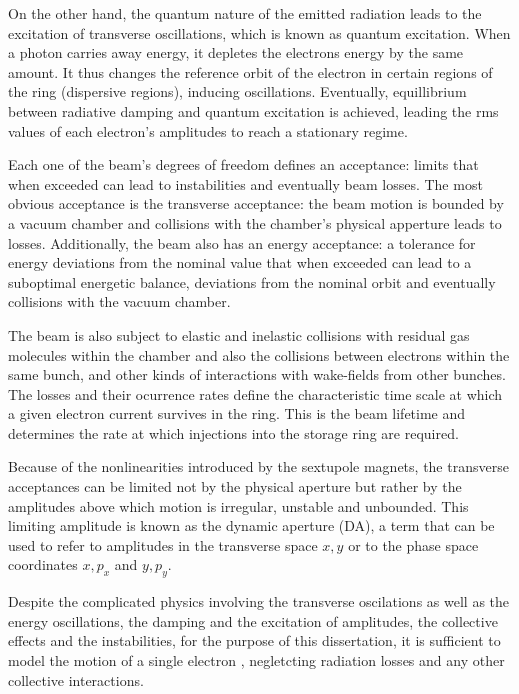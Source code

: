 On the other hand, the quantum nature of the emitted radiation leads to the excitation of transverse oscillations, which is known as quantum excitation. When a photon carries away energy, it depletes the electrons energy by the same amount. It thus changes the reference orbit of the electron in certain regions of the ring (dispersive regions), inducing oscillations. Eventually, equillibrium between radiative damping and quantum excitation is achieved, leading the rms values of each electron's amplitudes to reach a stationary regime.

Each one of the beam's degrees of freedom defines an acceptance: limits that when exceeded can lead to instabilities and eventually beam losses. The most obvious acceptance is the transverse acceptance: the beam motion is bounded by a vacuum chamber and collisions with the chamber's physical apperture leads to losses. Additionally, the beam also has an energy acceptance: a tolerance for energy deviations from the nominal value that when exceeded can lead  to a suboptimal energetic balance, deviations from the nominal orbit and eventually collisions with the vacuum chamber.

The beam is also subject to elastic and inelastic collisions with residual gas molecules within the chamber and also the collisions between electrons within the same bunch, and other kinds of interactions with wake-fields from other bunches. The losses and their ocurrence rates define the characteristic time scale at which a given electron current survives in the ring. This is the beam lifetime and determines the rate at which injections into the storage ring are required.

Because of the nonlinearities introduced by the sextupole magnets, the transverse acceptances can be limited not by the physical aperture but rather by the amplitudes above which motion is irregular, unstable and unbounded. This limiting amplitude is known as the dynamic aperture (DA), a term that can be used to refer to amplitudes in the transverse space $x,y$ or to the phase space coordinates $x, p_x$ and $y, p_y$.

Despite the complicated physics involving the transverse oscilations as  well as the energy oscillations, the damping and the excitation of amplitudes, the collective effects and the instabilities, for the purpose of this dissertation, it is sufficient to model the motion of a single electron , negletcting radiation losses and any other collective interactions.


